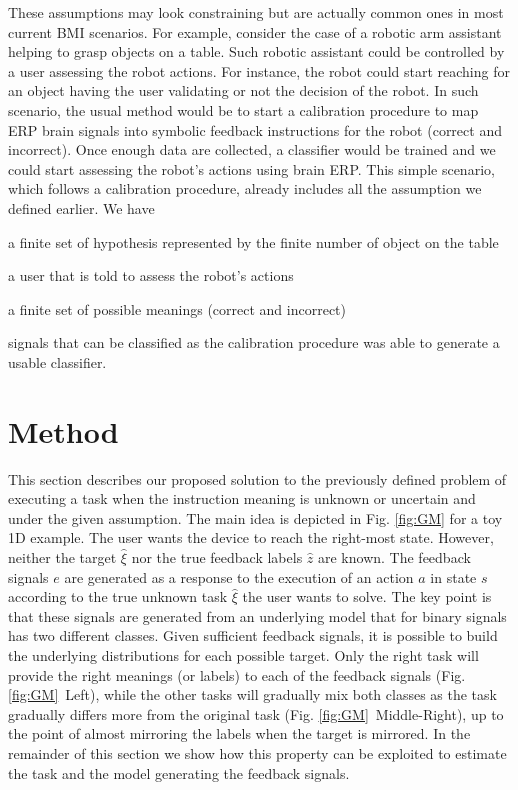 \documentclass[conference]{IEEEtran}
\begin{document}
These assumptions may look constraining but are actually common ones in most current BMI scenarios. For example, consider the case of a robotic arm assistant helping to grasp objects on a table. Such robotic assistant could be controlled by a user assessing the robot actions. For instance, the robot could start reaching for an object having the user validating or not the decision of the robot. In such scenario, the usual method would be to start a calibration procedure to map ERP brain signals into symbolic feedback instructions for the robot (correct and incorrect). Once enough data are collected, a classifier would be trained and we could start assessing the robot's actions using brain ERP. This simple scenario, which follows a calibration procedure, already includes all the assumption we defined earlier. We have 
\begin{inparaenum}
\item a finite set of hypothesis represented by the finite number of object on the table
\item a user that is told to assess the robot's actions
\item a finite set of possible meanings (correct and incorrect)
\item signals that can be classified as the calibration procedure was able to generate a usable classifier.
\end{inparaenum}
%
\section{Method}
%
This section describes our proposed solution to the previously defined problem of executing a task when the instruction meaning is unknown or uncertain and under the given assumption. The main idea is depicted in Fig. \ref{fig:GM} for a toy 1D example. The user wants the device to reach the right-most state. However, neither the target $\hat{\xi}$ nor the true feedback labels $\hat{z}$ are known. The feedback signals $e$ are generated as a response to the execution of an action $a$ in state $s$ according to the true unknown task $\hat{\xi}$ the user wants to solve.  The key point is that  these signals are generated from an underlying model that for binary signals has two different classes. Given sufficient feedback signals, it is possible to build the underlying distributions for each possible target. Only the right task will provide the right meanings (or labels) to each of the feedback signals (Fig. \ref{fig:GM}~Left), while the other tasks will gradually mix both classes as the task gradually differs more from the original task (Fig. \ref{fig:GM}~Middle-Right), up to the point of almost mirroring the labels when the target is mirrored. In the remainder of this section we show how this property can be exploited to estimate the task and the model generating the feedback signals.
\end{document}
